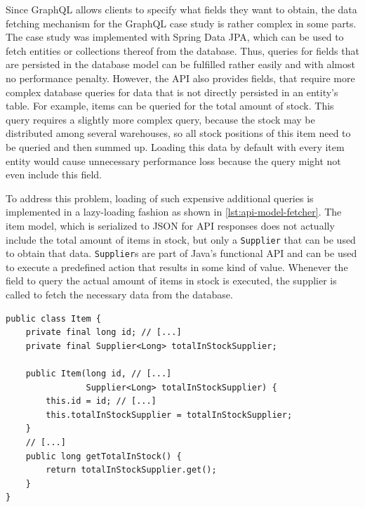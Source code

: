 Since GraphQL allows clients to specify what fields they want to obtain, the data fetching mechanism for the GraphQL case study is rather complex in some parts.
The case study was implemented with Spring Data \ac{JPA}, which can be used to fetch entities or collections thereof from the database.
Thus, queries for fields that are persisted in the database model can be fulfilled rather easily and with almost no performance penalty.
However, the \ac{API} also provides fields, that require more complex database queries for data that is not directly persisted in an entity's table.
For example, items can be queried for the total amount of stock.
This query requires a slightly more complex query, because the stock may be distributed among several warehouses, so all stock positions of this item need to be queried and then summed up.
Loading this data by default with every item entity would cause unnecessary performance loss because the query might not even include this field.

To address this problem, loading of such expensive additional queries is implemented in a lazy-loading fashion as shown in \autoref{lst:api-model-fetcher}.
The item model, which is serialized to \ac{JSON} for \ac{API} responses does not actually include the total amount of items in stock, but only a \texttt{Supplier} that can be used to obtain that data.
\texttt{Supplier}s are part of Java's functional \ac{API} and can be used to execute a predefined action that results in some kind of value.
Whenever the field to query the actual amount of items in stock is executed, the supplier is called to fetch the necessary data from the database.

\begin{lstlisting}[caption={Data Fetching in \acs{API} Models}, style=java-ext, label={lst:api-model-fetcher}]
public class Item {
    private final long id; // [...]
    private final Supplier<Long> totalInStockSupplier;

    public Item(long id, // [...]
                Supplier<Long> totalInStockSupplier) {
        this.id = id; // [...]
        this.totalInStockSupplier = totalInStockSupplier;
    }
    // [...]
    public long getTotalInStock() {
        return totalInStockSupplier.get();
    }
}
\end{lstlisting}

